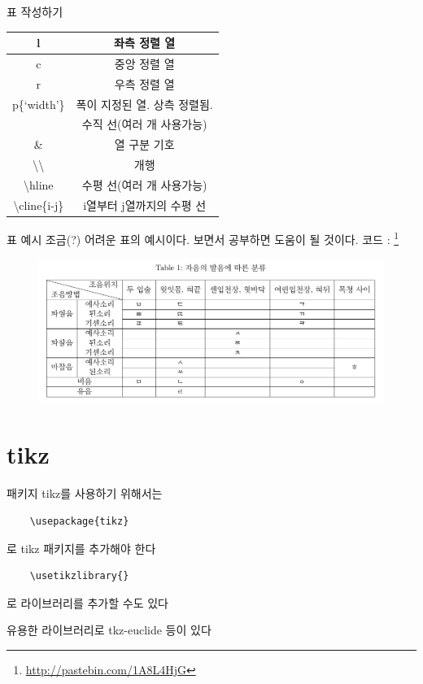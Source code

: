 \documentclass[12pt]{beamer}
\begin{document}
\begin{frame}{표 작성하기}
	\begin{table}
		\centering
		\begin{tabular}{|c|c|}
			\hline
			l & 좌측 정렬 열 \\
			\hline
			c & 중앙 정렬 열 \\
			\hline
			r & 우측 정렬 열 \\
			\hline
			p\{`width'\} & 폭이 지정된 열. 상측 정렬됨. \\
			\hline
			\textbar & 수직 선(여러 개 사용가능) \\
			\hline
			\& & 열 구분 기호 \\
			\hline
			\textbackslash\textbackslash & 개행 \\
			\hline
			\textbackslash hline & 수평 선(여러 개 사용가능) \\
			\hline
			\textbackslash cline\{i-j\} & i열부터 j열까지의 수평 선 \\
			\hline
		\end{tabular}
	\end{table}
\end{frame}
\begin{frame}{표 예시}
	조금(?) 어려운 표의 예시이다. 보면서 공부하면 도움이 될 것이다.
	코드 : \footnote{\url{http://pastebin.com/1A8L4HjG}}
	\begin{figure}
		\centering
		\includegraphics[width=\textwidth]{table_adv.pdf}
	\end{figure}
\end{frame}
\section{tikz}
\begin{frame}[fragile]{패키지}
	tikz를 사용하기 위해서는
	\begin{lstlisting}
	\usepackage{tikz}
	\end{lstlisting}
	로 tikz 패키지를 추가해야 한다
	\vfill
	\begin{lstlisting}
	\usetikzlibrary{}
	\end{lstlisting}
	로 라이브러리를 추가할 수도 있다
	
	유용한 라이브러리로 tkz-euclide 등이 있다
\end{frame}
\end{document}
